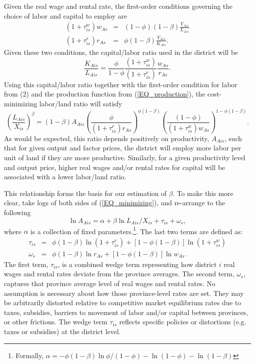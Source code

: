 \documentclass[11pt]{article}
\begin{document}
Given the real wage and rental rate, the first-order conditions governing the choice of labor and capital to employ are
\begin{eqnarray}
    (1+\tau^w_{is})w_{As} &=& (1-\phi)(1-\beta) \frac{Y_{Ais}}{L_{Ais}} \\ \nonumber 
    (1+\tau^r_{is})r_{As} &=& \phi(1-\beta)\frac{Y_{Ais}}{K_{Ais}}. \label{EQ_factorprices}
\end{eqnarray}
Given these two conditions, the capital/labor ratio used in the district will be
\begin{equation}
	\frac{K_{Ais}}{L_{Ais}} = \frac{\phi}{1-\phi} \frac{(1+\tau^w_{is})}{(1+\tau^r_{is})} \frac{w_{As}}{r_{As}}. \nonumber
\end{equation}
Using this capital/labor ratio together with the first-order condition for labor from (2) and the production function from (\ref{EQ_production}), the cost-minimizing labor/land ratio will satisfy 
\begin{equation}
	\left(\frac{L_{Ais}}{X_{is}}\right)^{\beta} = (1-\beta) A_{Ais} \left(\frac{\phi}{(1+\tau^r_{is})r_{As}}\right)^{\phi(1-\beta)}\left(\frac{(1-\phi)}{(1+\tau^w_{is})w_{As}}\right)^{1 - \phi(1-\beta)}. \label{EQ_minimizing}
\end{equation}
As would be expected, this ratio depends positively on productivity, $A_{Ais}$, such that for given output and factor prices, the district will employ more labor per unit of land if they are more productive. Similarly, for a given productivity level and output price, higher real wages and/or rental rates for capital will be associated with a lower labor/land ratio.

This relationship forms the basis for our estimation of $\beta$. To make this more clear, take logs of both sides of (\ref{EQ_minimizing}), and re-arrange to the following
\begin{equation}
	\ln A_{Ais} = \alpha + \beta \ln L_{Ais}/X_{is} + \tau_{is} + \omega_s, \label{EQ_est}
\end{equation}
where $\alpha$ is a collection of fixed parameters.\footnote{Formally, $\alpha = -\phi(1-\beta)\ln \phi/(1-\phi) - \ln (1-\phi) - \ln (1-\beta)$}. The last two terms are defined as:
\begin{eqnarray}
	\tau_{is} &=& \phi(1-\beta) \ln (1+\tau^r_{is}) + [1-\phi(1-\beta)] \ln (1+\tau^w_{is}) \\
	\omega_s &=& \phi(1-\beta) \ln r_{As} + [1-\phi(1-\beta)] \ln w_{As}.
\end{eqnarray}
The first term, $\tau_{is}$, is a combined wedge term representing how district $i$ real wages and rental rates deviate from the province averages. The second term, $\omega_s$, captures that province average level of real wages and rental rates. No assumption is necessary about how those province-level rates are set. They may be arbitrarily distorted relative to competitive market equilibrium rates due to taxes, subsidies, barriers to movement of labor and/or capital between provinces, or other frictions. The wedge term $\tau_{is}$ reflects specific policies or distortions (e.g. taxes or subsidies) at the district level. 
\end{document}
